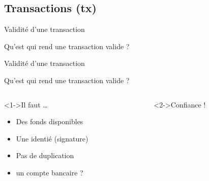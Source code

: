 \documentclass[presentation]{beamer}
\begin{document}
\subsection{Transactions (tx)}
\label{sec:orgddc64f4}
\begin{frame}[label={sec:orgae65ccd}]{Validité d'une transaction}
\begin{block}{Qu'est qui rend une transaction valide ?}
\end{block}
\end{frame}
\begin{frame}[label={sec:orgc02c2d1}]{Validité d'une transaction}
\begin{block}{Qu'est qui rend une transaction valide ?}
\end{block}
\begin{columns}
\begin{column}{0.4\columnwidth}
\begin{block}<1->{Il faut \ldots{}}
\begin{itemize}
\item Des fonds disponibles
\item Une identié  (signature)
\item Pas de duplication
\item <2> un compte bancaire ?
\end{itemize}
\end{block}
\end{column}
\begin{column}{0.6\columnwidth}
\begin{block}<2->{Confiance !}
\end{block}
\end{column}
\end{columns}
\end{frame}
\end{document}
